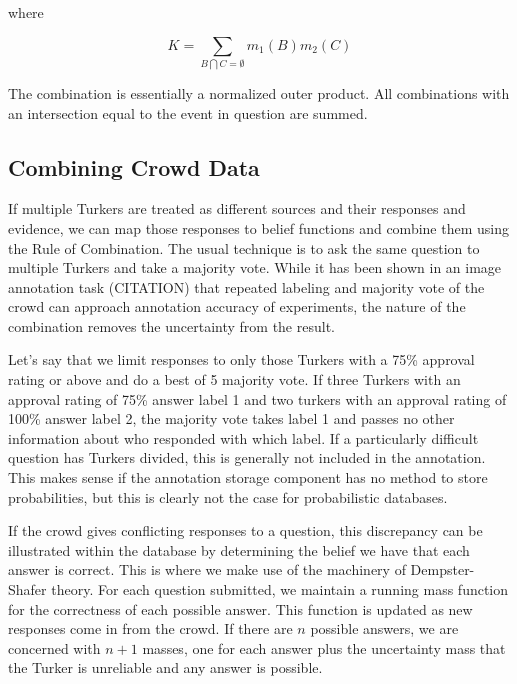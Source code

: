 where

\begin{equation*}
K=\sum_{B\bigcap C=\emptyset}m_{1}(B)m_{2}(C)
\end{equation*}

The combination is essentially a normalized outer product.  All combinations with an intersection equal to the event in question are summed.
 
\subsection{Combining Crowd Data}

If multiple Turkers are treated as different sources and their responses and evidence, we can map those responses to belief functions and combine them using the Rule of Combination.  The usual technique is to ask the same question to multiple Turkers and take a majority vote.  While it has been shown in an image annotation task (CITATION) that repeated labeling and majority vote of the crowd can approach annotation accuracy of experiments, the nature of the combination removes the uncertainty from the result.

Let's say that we limit responses to only those Turkers with a 75\% approval rating or above and do a best of 5 majority vote.  If three Turkers with an approval rating of 75\% answer label 1 and two turkers with an approval rating of 100\% answer label 2, the majority vote takes label 1 and passes no other information about who responded with which label.  If a particularly difficult question has Turkers divided, this is generally not included in the annotation.  This makes sense if the annotation storage component has no method to store probabilities, but this is clearly not the case for probabilistic databases.

If the crowd gives conflicting  responses to a question, this discrepancy can be illustrated within the database by determining the belief we have that each answer is correct.  This is where we make use of the machinery of Dempster-Shafer theory.  For each question submitted, we maintain a running mass function for the correctness of each possible answer.  This function is updated as new responses come in from the crowd.  If there are $n$ possible answers, we are concerned with $n+1$ masses, one for each answer plus the uncertainty mass that the Turker is unreliable and any answer is possible.  


